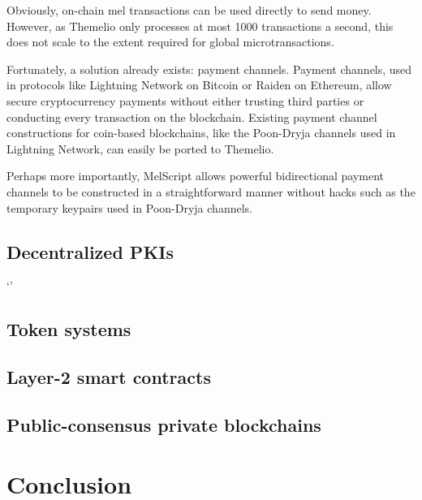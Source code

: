 \documentclass[headinclude]{scrbook}
\begin{document}
Obviously, on-chain mel transactions can be used directly to send money. However, as Themelio only processes at most 1000 transactions a second, this does not scale to the extent required for global microtransactions.

Fortunately, a solution already exists: payment channels. Payment channels, used in protocols like Lightning Network on Bitcoin or Raiden on Ethereum, allow secure cryptocurrency payments without either trusting third parties or conducting every transaction on the blockchain. Existing payment channel constructions for coin-based blockchains, like the Poon-Dryja channels used in Lightning Network, can easily be ported to Themelio.

Perhaps more importantly, MelScript allows powerful bidirectional payment channels to be constructed in a straightforward manner without hacks such as the temporary keypairs used in Poon-Dryja channels.

\section{Decentralized PKIs}

`'

\section{Token systems}

\section{Layer-2 smart contracts}

\section{Public-consensus private blockchains}

\chapter{Conclusion}


\printbibliography
\end{document}
